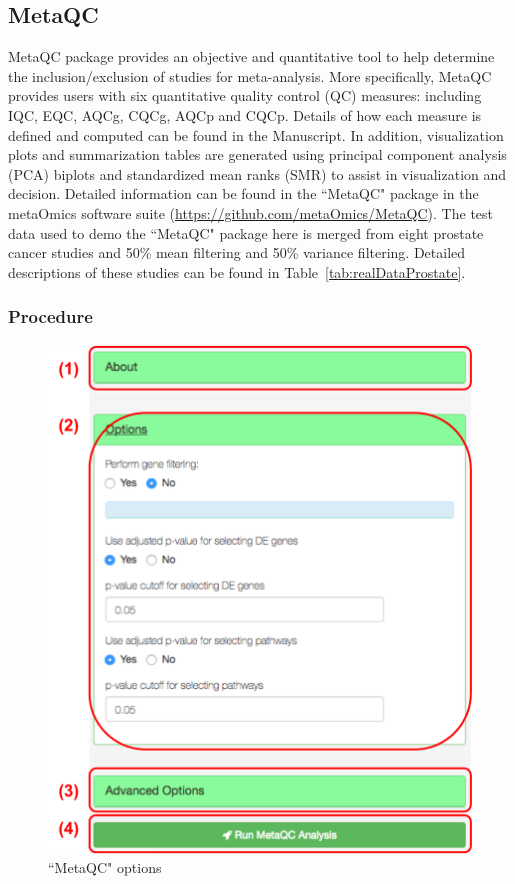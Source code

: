 \subsection{MetaQC}
MetaQC package provides an objective and quantitative tool to help determine the inclusion/exclusion of studies for meta-analysis. More specifically, MetaQC provides users with six quantitative quality control (QC) measures: including IQC, EQC, AQCg, CQCg, AQCp and CQCp. Details of how each measure is defined and computed can be found in the Manuscript. In addition, visualization plots and summarization tables are generated using principal component analysis (PCA) biplots and standardized mean ranks (SMR) to assist in visualization and decision. Detailed information can be found in the ``MetaQC" package in the metaOmics software suite (\url{https://github.com/metaOmics/MetaQC}). The test data used to demo the ``MetaQC" package here is merged from eight prostate cancer studies and 50\% mean filtering and 50\% variance filtering. 
Detailed descriptions of these studies can be found in Table~\ref{tab:realDataProstate}. 

\subsubsection{Procedure}

\begin{figure}[H]
\begin{center}
\includegraphics[scale=0.5]{./figure/metaQC/metaQCoption.pdf}
\caption{``MetaQC" options}
\label{fig:MetaQCoption}
\end{center}
\end{figure}

